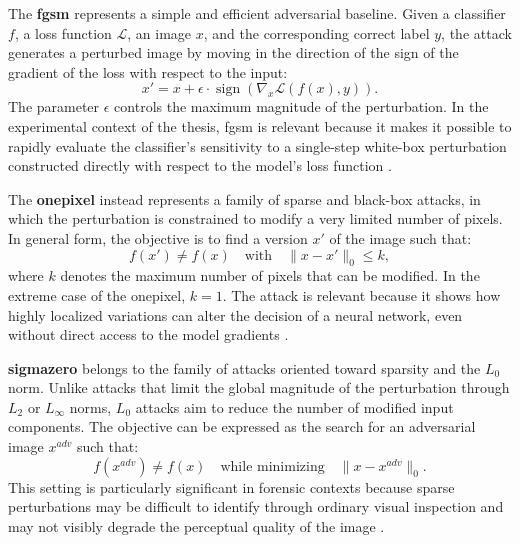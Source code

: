 The \textbf{\acrfull{fgsm}} represents a simple and efficient adversarial
baseline. Given a classifier \(f\), a loss function \(\mathcal{L}\), an image
\(x\), and the corresponding correct label \(y\), the attack generates a
perturbed image by moving in the direction of the sign of the gradient of the
loss with respect to the input:
\[
x' = x + \epsilon \cdot \operatorname{sign}
\left(\nabla_x \mathcal{L}(f(x), y)\right).
\]
The parameter \(\epsilon\) controls the maximum magnitude of the perturbation.
In the experimental context of the thesis, \gls{fgsm} is relevant because it
makes it possible to rapidly evaluate the classifier's sensitivity to a
single-step white-box perturbation constructed directly with respect to the
model's loss function \cite{goodfellow2015explaining}.

The \textbf{\gls{onepixel}} instead represents a family of sparse and black-box
attacks, in which the perturbation is constrained to modify a very limited
number of pixels. In general form, the objective is to find a version \(x'\) of
the image such that:
\[
f(x') \neq f(x)
\quad \text{with} \quad
\|x - x'\|_0 \leq k,
\]
where \(k\) denotes the maximum number of pixels that can be modified. In the
extreme case of the \gls{onepixel}, \(k=1\). The attack is relevant because it
shows how highly localized variations can alter the decision of a neural
network, even without direct access to the model gradients
\cite{su2019onepixel}.

\textbf{\gls{sigmazero}} belongs to the family of attacks oriented toward
sparsity and the \(L_0\) norm. Unlike attacks that limit the global magnitude
of the perturbation through \(L_2\) or \(L_\infty\) norms, \(L_0\) attacks aim
to reduce the number of modified input components. The objective can be
expressed as the search for an adversarial image \(x^{adv}\) such that:
\[
f(x^{adv}) \neq f(x)
\quad \text{while minimizing} \quad
\|x - x^{adv}\|_0.
\]
This setting is particularly significant in forensic contexts because sparse
perturbations may be difficult to identify through ordinary visual inspection
and may not visibly degrade the perceptual quality of the image
\cite{zhao2024sigmazero}.


